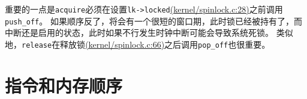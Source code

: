 重要的一点是\texttt{acquire}必须在设置\texttt{lk->locked}\href{https://github.com/mit-pdos/xv6-riscv/blob/riscv//kernel/spinlock.c#L28}{(kernel/spinlock.c:28)}之前调用\texttt{push\_off}。
如果顺序反了，将会有一个很短的窗口期，此时锁已经被持有了，而中断还是启用的状态，此时如果不行发生时钟中断可能会导致系统死锁。
类似地，\texttt{release}在释放锁\href{https://github.com/mit-pdos/xv6-riscv/blob/riscv//kernel/spinlock.c#L66}{(kernel/spinlock.c:66)}之后调用\texttt{pop\_off}也很重要。

\section{指令和内存顺序}

